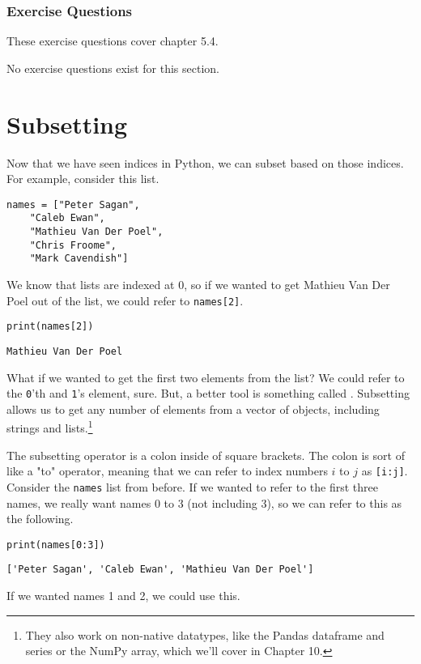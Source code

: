 \subsubsection*{Exercise Questions}
These exercise questions cover chapter 5.4.

No exercise questions exist for this section.

\section{Subsetting}
Now that we have seen indices in Python, we can subset based on those indices. For example, consider this list.\par
\begin{lstlisting}[style=pippython]
names = ["Peter Sagan",
    "Caleb Ewan",
    "Mathieu Van Der Poel",
    "Chris Froome",
    "Mark Cavendish"]
\end{lstlisting}
We know that lists are indexed at 0, so if we wanted to get Mathieu Van Der Poel out of the list, we could refer to \verb|names[2]|.
\begin{lstlisting}[style=pippython]
print(names[2])
\end{lstlisting}
\begin{lstlisting}[style=none]
Mathieu Van Der Poel
\end{lstlisting}
What if we wanted to get the first two elements from the list? We could refer to the \verb|0|'th and \verb|1|'s element, sure. But, a better tool is something called . Subsetting allows us to get any number of elements from a vector of objects, including strings and lists.\footnote{They also work on non-native datatypes, like the Pandas dataframe and series or the NumPy array, which we'll cover in Chapter 10.}\par
The subsetting operator is a colon inside of square brackets. The colon is sort of like a "to" operator, meaning that we can refer to index numbers $i$ to $j$ as \verb|[i:j]|. Consider the \verb|names| list from before. If we wanted to refer to the first three names, we really want names 0 to 3 (not including 3), so we can refer to this as the following.
\begin{lstlisting}[style=pippython]
print(names[0:3])
\end{lstlisting}
\begin{lstlisting}[style=none]
['Peter Sagan', 'Caleb Ewan', 'Mathieu Van Der Poel']
\end{lstlisting}
If we wanted names 1 and 2, we could use this.
